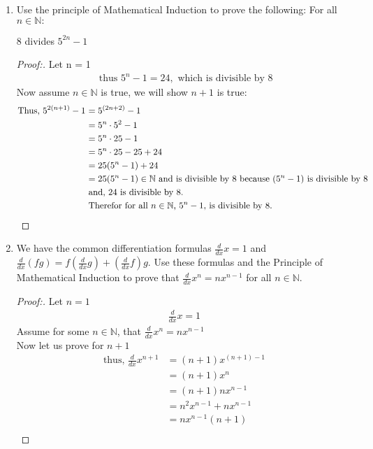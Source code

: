 \documentclass[11pt]{article}
\begin{document}
\begin{enumerate}
    \item Use the principle of Mathematical Induction to prove the following: For all $n \in \mathbb{N}:$
    \begin{center}
        8 divides $5^{2n} -1$
    \end{center}
        \begin{proof}[Proof:\nopunct]
            Let n = 1
            \begin{align*}
                \text{ thus $5^n-1 = 24,$ which is divisible by 8}
            \end{align*}
                Now assume $n \in \mathbb{N}$ is true, we will show $n+1$ is true:
            \begin{align*}
                \text{Thus, $5^{2(n+1)}-1 $ } 
                & \text{$ = 5^{(2n+2)} -1$} \\
                & \text{$ = 5^n\cdot 5^2 - 1$} \\
                & \text{$ = 5^n\cdot 25 - 1$} \\
                & \text{$ = 5^n\cdot 25 -25+24$} \\
                & \text{$ = 25(5^n -1)+24$} \\
                & \text{$ = 25(5^n - 1) \in \mathbb{N}$ and is divisible by 8 because $(5^n - 1)$ is divisible by 8} \\
                & \text{and, 24 is divisible by 8.} \\
                & \text{Therefor for all $n\in \mathbb{N}$, $5^n - 1,$ is divisible by 8.}
            \end{align*}
        \end{proof}
        
    \pagebreak
    \item We have the common differentiation formulas $\frac{d}{dx} x=1$ and $\frac{d}{dx}(fg)=f(\frac{d}{dx}g) + (\frac{d}{dx}f)g$. 
    \newline Use these formulas and the Principle of Mathematical Induction to prove that $\frac{d}{dx}x^n = nx^{n-1}$ for all $n \in \mathbb{N}$.
        \begin{proof}[Proof:\nopunct]
            Let $n=1$
            \begin{align*}
                \frac{d}{dx} x=1
            \end{align*}
            Assume for some $n\in \mathbb{N}$, that $\frac{d}{dx}x^n = nx^{n-1}$ \\
            Now let us prove for $n+1$
            \begin{align*}
                \text{thus, } \frac{d}{dx}x^{n+1} & = (n+1)x^{(n+1)-1} \\
                & = (n+1)x^n \\ 
                & = (n+1)nx^{n-1} \\
                & = n^2x^{n-1} + nx^{n-1} \\
                & = nx^{n-1}(n+1) \\
            \end{align*}
        \end{proof}
        

\end{enumerate}
\end{document}
